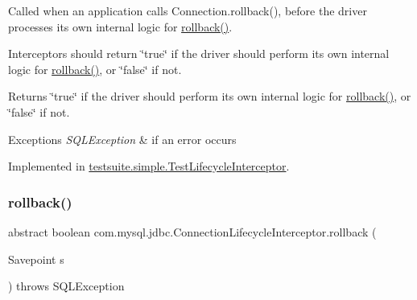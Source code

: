 Called when an application calls Connection.\+rollback(), before the driver processes its own internal logic for \mbox{\hyperlink{interfacecom_1_1mysql_1_1jdbc_1_1_connection_lifecycle_interceptor_a1e23e5b6724c8362009e5d87938507de}{rollback()}}.

Interceptors should return \char`\"{}true\char`\"{} if the driver should perform its own internal logic for \mbox{\hyperlink{interfacecom_1_1mysql_1_1jdbc_1_1_connection_lifecycle_interceptor_a1e23e5b6724c8362009e5d87938507de}{rollback()}}, or \char`\"{}false\char`\"{} if not.

\begin{DoxyReturn}{Returns}
\char`\"{}true\char`\"{} if the driver should perform its own internal logic for \mbox{\hyperlink{interfacecom_1_1mysql_1_1jdbc_1_1_connection_lifecycle_interceptor_a1e23e5b6724c8362009e5d87938507de}{rollback()}}, or \char`\"{}false\char`\"{} if not.
\end{DoxyReturn}

\begin{DoxyExceptions}{Exceptions}
{\em S\+Q\+L\+Exception} & if an error occurs \\
\hline
\end{DoxyExceptions}


Implemented in \mbox{\hyperlink{classtestsuite_1_1simple_1_1_test_lifecycle_interceptor_a7cdeb42f7891e22dadce89627befbcdf}{testsuite.\+simple.\+Test\+Lifecycle\+Interceptor}}.

\mbox{\label{interfacecom_1_1mysql_1_1jdbc_1_1_connection_lifecycle_interceptor_ad7d4ade6867189eceeaad2c062aff0ee}} 
\subsubsection{\texorpdfstring{rollback()}{rollback()}\hspace{0.1cm}{\footnotesize\ttfamily [2/2]}}
{\footnotesize\ttfamily abstract boolean com.\+mysql.\+jdbc.\+Connection\+Lifecycle\+Interceptor.\+rollback (\begin{DoxyParamCaption}\item[{Savepoint}]{s }\end{DoxyParamCaption}) throws S\+Q\+L\+Exception\hspace{0.3cm}{\ttfamily [abstract]}}

